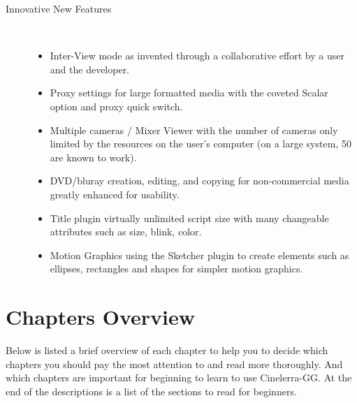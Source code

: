 \begin{description}
\begin{itemize}
            \end{itemize}
            \item[Innovative New Features] ~\\
                \begin{itemize}
                    \item Inter-View mode as invented through a collaborative effort by a user and the developer.
                    \item Proxy settings for large formatted media with the coveted Scalar option and proxy quick switch.
                    \item Multiple cameras / Mixer Viewer with the number of cameras only limited by the resources on the user’s computer (on a large system, 50 are known to work).
                    \item DVD/bluray creation, editing, and copying for non-commercial media greatly enhanced for usability.
                    \item Title plugin virtually unlimited script size with many changeable attributes such as size, blink, color.
                    \item Motion Graphics using the Sketcher plugin to create elements such as ellipses, rectangles and shapes for simpler motion graphics.
                \end{itemize}
\end{description}

\section*{Chapters Overview}%
\label{sec:chapters_overview}

Below is listed a brief overview of each chapter to help you to decide which chapters you should pay the most attention to and read more thoroughly. 
And which chapters are important for beginning to learn to use Cinelerra-GG. At the end of the descriptions is a list of the sections to read for beginners.

